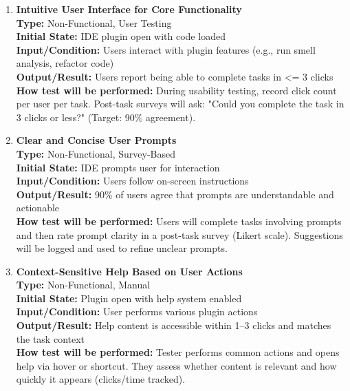 \documentclass[12pt, titlepage]{article}
\begin{document}
\begin{enumerate}[label={\bf \textcolor{Maroon}{test-UH-\arabic*}},
    wide=0pt, font=\itshape]
  \item \textbf{Intuitive User Interface for Core Functionality} \\[2mm]
    \textbf{Type:} Non-Functional, User Testing \\
    \textbf{Initial State:} IDE plugin open with code loaded \\
    \textbf{Input/Condition:} Users interact with plugin features (e.g., run smell analysis, refactor code) \\
    \textbf{Output/Result:} Users report being able to complete tasks in <= 3 clicks \\[2mm]
    \textbf{How test will be performed:} During usability testing, record click count per user per task. Post-task surveys will ask: "Could you complete the task in 3 clicks or less?" (Target: 90\% agreement).

  \item \textbf{Clear and Concise User Prompts} \\[2mm]
    \textbf{Type:} Non-Functional, Survey-Based \\
    \textbf{Initial State:} IDE prompts user for interaction \\
    \textbf{Input/Condition:} Users follow on-screen instructions \\
    \textbf{Output/Result:} 90\% of users agree that prompts are understandable and actionable \\[2mm]
    \textbf{How test will be performed:} Users will complete tasks involving prompts and then rate prompt clarity in a post-task survey (Likert scale). Suggestions will be logged and used to refine unclear prompts.

  \item \textbf{Context-Sensitive Help Based on User Actions} \\[2mm]
    \textbf{Type:} Non-Functional, Manual \\
    \textbf{Initial State:} Plugin open with help system enabled \\
    \textbf{Input/Condition:} User performs various plugin actions \\
    \textbf{Output/Result:} Help content is accessible within 1–3 clicks and matches the task context \\[2mm]
    \textbf{How test will be performed:} Tester performs common actions and opens help via hover or shortcut. They assess whether content is relevant and how quickly it appears (clicks/time tracked).


\end{enumerate}
\end{document}
